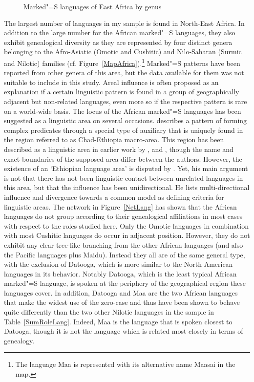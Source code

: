 \begin{figure}[h,t,b] \centering {}%
\caption{Marked"=S languages of East Africa by genus}\label{MapAfrica}
\end{figure}

The largest number of languages in my sample is found in North-East Africa. 
In addition to the large number for the African marked"=S languages, they also exhibit genealogical diversity as they are represented by four distinct genera belonging to the Afro-Asiatic (Omotic and Cushitic) and Nilo-Saharan (Surmic and Nilotic) families (cf. Figure~\vref{MapAfrica}).\footnote{The language Maa is represented with its alternative name Maasai in the map.} 
Marked"=S patterns have been reported from other genera of this area, but the data available for them was not suitable to include in this study. 
Areal influence is often proposed as an explanation if a certain linguistic pattern is found in a group of geographically adjacent but non-related languages, even more so if the respective pattern is rare on a world-wide basis.
The locus of the African marked"=S languages has been suggested as a linguistic area on several occasions.
\citet{Gueldemann:2005} describes a pattern of forming complex predicates through a special type of auxiliary that is uniquely found in the region referred to as Chad-Ethiopia macro-area. 
This region has been described as a linguistic area in earlier work by \citet{Greenberg:1983}, \citet{Ferguson:1976} and \citet{Heine:1976}, though the name and exact boundaries of the supposed area differ between the authors.
However, the existence of an `Ethiopian language area' is disputed by \citet{Tosco:2000}. 
Yet, his main argument is not that there has not been linguistic contact between unrelated languages in this area, but that the influence has been unidirectional. 
He lists multi-directional influence and divergence towards a common model as defining criteria for linguistic areas. 
The network in Figure~\ref{NetLang} has shown that the African languages do not group according to their genealogical affiliations in most cases with respect to the roles studied here. 
Only the Omotic languages in combination with most Cushitic languages do occur in adjacent position. 
However, they do not exhibit any clear tree-like branching from the other African languages (and also the Pacific languages plus Maidu). %
Instead they all are of the same general type, with the exclusion of Datooga, which is more similar to the North American languages in its behavior. 
Notably Datooga, which is the least typical African marked"=S language, is spoken at the periphery of the geographical region these languages cover.
In addition, Datooga and Maa are the two African languages that make the widest use of the zero-case and thus have been shown to behave quite differently than the two other Nilotic languages in the sample in Table~\ref{SumRoleLang}. 
Indeed, Maa is the language that is spoken closest to Datooga, though it is not the language which is related most closely in terms of genealogy. 


